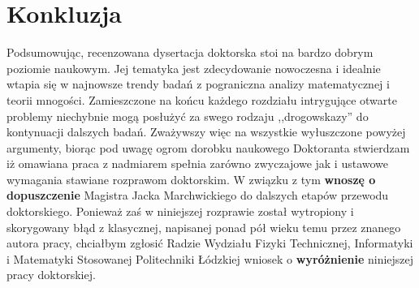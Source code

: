 \documentclass[12pt]{article}
\begin{document}
\section{Konkluzja}
Podsumowując, recenzowana dysertacja doktorska stoi
na bardzo dobrym poziomie naukowym. Jej tematyka jest
zdecydowanie nowoczesna i idealnie wtapia się w najnowsze
trendy badań z pograniczna analizy matematycznej i teorii mnogości.
Zamieszczone na końcu każdego rozdziału intrygujące otwarte problemy
niechybnie mogą posłużyć za swego rodzaju ,,drogowskazy'' 
do kontynuacji dalszych badań.
  Zważywszy więc na wszystkie wyłuszczone powyżej argumenty,
biorąc pod uwagę ogrom dorobku naukowego Doktoranta 
stwierdzam iż omawiana 
praca z nadmiarem spełnia zarówno zwyczajowe jak i ustawowe
wymagania stawiane rozprawom doktorskim. W związku z tym
{\bf wnoszę o dopuszczenie} Magistra Jacka Marchwickiego do dalszych
etapów przewodu doktorskiego.
  Ponieważ zaś w niniejszej rozprawie został wytropiony i 
skorygowany błąd z klasycznej, napisanej ponad pół wieku temu przez znanego
autora pracy, chciałbym zgłosić Radzie Wydziału Fizyki 
Technicznej, Informatyki i Matematyki Stosowanej Politechniki
Łódzkiej wniosek o {\bf wyróżnienie} niniejszej pracy doktorskiej.
\end{document}
